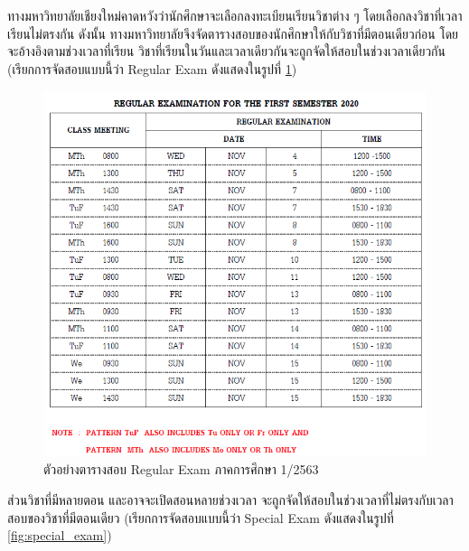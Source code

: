 ทางมหาวิทยาลัยเชียงใหม่คาดหวังว่านักศึกษาจะเลือกลงทะเบียนเรียนวิชาต่าง ๆ โดยเลือกลงวิชาที่เวลาเรียนไม่ตรงกัน 
ดังนั้น ทางมหาวิทยาลัยจึงจัดตารางสอบของนักศึกษาให้กับวิชาที่มีตอนเดียวก่อน โดยจะอ้างอิงตามช่วงเวลาที่เรียน 
วิชาที่เรียนในวันและเวลาเดียวกันจะถูกจัดให้สอบในช่วงเวลาเดียวกัน (เรียกการจัดสอบแบบนี้ว่า Regular Exam ดังแสดงในรูปที่ \ref{fig:regular_exam}) 
%
\begin{figure}
    \centering
    \includegraphics[width=\linewidth]{images/regular_exam.png}
    \caption[ตัวอย่างตารางสอบ Regular Exam ภาคการศึกษา 1/2563]{ตัวอย่างตารางสอบ Regular Exam ภาคการศึกษา 1/2563}
    \label{fig:regular_exam}
\end{figure}
%
ส่วนวิชาที่มีหลายตอน และอาจจะเปิดสอนหลายช่วงเวลา จะถูกจัดให้สอบในช่วงเวลาที่ไม่ตรงกับเวลาสอบของวิชาที่มีตอนเดียว  (เรียกการจัดสอบแบบนี้ว่า Special Exam ดังแสดงในรูปที่ \ref{fig:special_exam}) 
%
